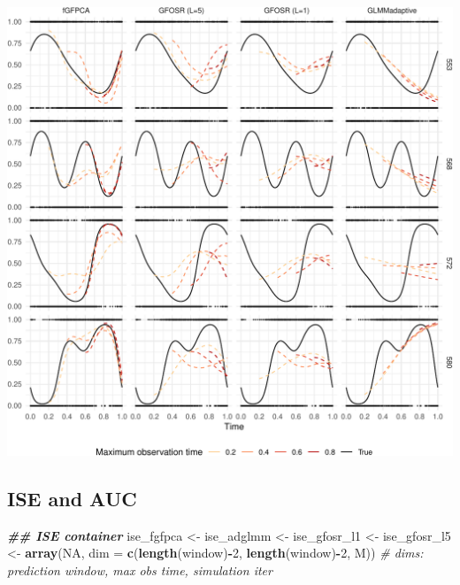 \documentclass[
]{article}
\newenvironment{Shaded}{\begin{snugshade}}{\end{snugshade}}
\newcommand{\AttributeTok}[1]{\textcolor[rgb]{0.13,0.29,0.53}{#1}}
\newcommand{\CommentTok}[1]{\textcolor[rgb]{0.56,0.35,0.01}{\textit{#1}}}
\newcommand{\ConstantTok}[1]{\textcolor[rgb]{0.56,0.35,0.01}{#1}}
\newcommand{\DecValTok}[1]{\textcolor[rgb]{0.00,0.00,0.81}{#1}}
\newcommand{\DocumentationTok}[1]{\textcolor[rgb]{0.56,0.35,0.01}{\textbf{\textit{#1}}}}
\newcommand{\FunctionTok}[1]{\textcolor[rgb]{0.13,0.29,0.53}{\textbf{#1}}}
\newcommand{\NormalTok}[1]{#1}
\newcommand{\OtherTok}[1]{\textcolor[rgb]{0.56,0.35,0.01}{#1}}
\newcommand{\SpecialCharTok}[1]{\textcolor[rgb]{0.81,0.36,0.00}{\textbf{#1}}}
\begin{document}
\includegraphics{manuscript_files/figure-latex/fig_large_sim-1.pdf}

\hypertarget{ise-and-auc}{%
\subsection{ISE and AUC}\label{ise-and-auc}}

\begin{Shaded}
\begin{Highlighting}[]
\DocumentationTok{\#\# ISE container }
\NormalTok{ise\_fgfpca }\OtherTok{\textless{}{-}}\NormalTok{ ise\_adglmm }\OtherTok{\textless{}{-}}\NormalTok{ ise\_gfosr\_l1 }\OtherTok{\textless{}{-}}\NormalTok{ ise\_gfosr\_l5 }\OtherTok{\textless{}{-}} 
  \FunctionTok{array}\NormalTok{(}\ConstantTok{NA}\NormalTok{, }\AttributeTok{dim =} \FunctionTok{c}\NormalTok{(}\FunctionTok{length}\NormalTok{(window)}\SpecialCharTok{{-}}\DecValTok{2}\NormalTok{, }\FunctionTok{length}\NormalTok{(window)}\SpecialCharTok{{-}}\DecValTok{2}\NormalTok{, M))}
\CommentTok{\# dims: prediction window, max obs time, simulation iter}
\end{Highlighting}
\end{Shaded}
\end{document}
